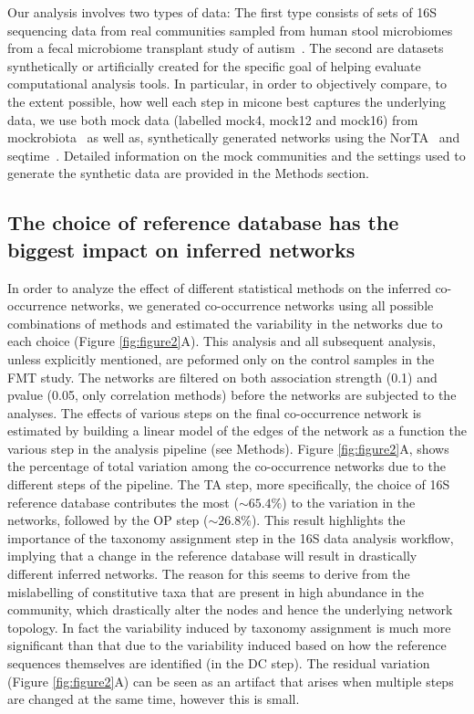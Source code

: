   Our analysis involves two types of data: The first type consists of sets of 16S sequencing data from real communities sampled from human stool microbiomes from a fecal microbiome transplant study of autism~\cite{Kang2017}.
  The second are datasets synthetically or artificially created for the specific goal of helping evaluate computational analysis tools.
  In particular, in order to objectively compare, to the extent possible, how well each step in \ac{micone} best captures the underlying data, we use both mock data (labelled mock4, mock12 and mock16) from mockrobiota~\cite{Bokulich2016} as well as, synthetically generated networks using the NorTA~\cite{Kurtz2015} and seqtime~\cite{Rottjers2018}.
  Detailed information on the mock communities and the settings used to generate the synthetic data are provided in the Methods section.

  \FloatBarrier

  \subsection*{The choice of reference database has the biggest impact on inferred networks}


  In order to analyze the effect of different statistical methods on the inferred co-occurrence networks, we generated co-occurrence networks using all possible combinations of methods and estimated the variability in the networks due to each choice (Figure \ref{fig:figure2}A).
  This analysis and all subsequent analysis, unless explicitly mentioned, are peformed only on the control samples in the FMT study.
  The networks are filtered on both association strength (0.1) and pvalue (0.05, only correlation methods) before the networks are subjected to the analyses.
  The effects of various steps on the final co-occurrence network is estimated by building a linear model of the edges of the network as a function the various step in the analysis pipeline (see Methods).
  Figure \ref{fig:figure2}A, shows the percentage of total variation among the co-occurrence networks due to the different steps of the pipeline.
  The TA step, more specifically, the choice of 16S reference database contributes the most ($\sim65.4\%$) to the variation in the networks, followed by the OP step ($\sim26.8\%$).
  This result highlights the importance of the taxonomy assignment step in the 16S data analysis workflow, implying that a change in the reference database will result in drastically different inferred networks.
  The reason for this seems to derive from the mislabelling of constitutive taxa that are present in high abundance in the community, which drastically alter the nodes and hence the underlying network topology.
  In fact the variability induced by taxonomy assignment is much more significant than that due to the variability induced based on how the reference sequences themselves are identified (in the DC step).
  The residual variation (Figure \ref{fig:figure2}A) can be seen as an artifact that arises when multiple steps are changed at the same time, however this is small.

